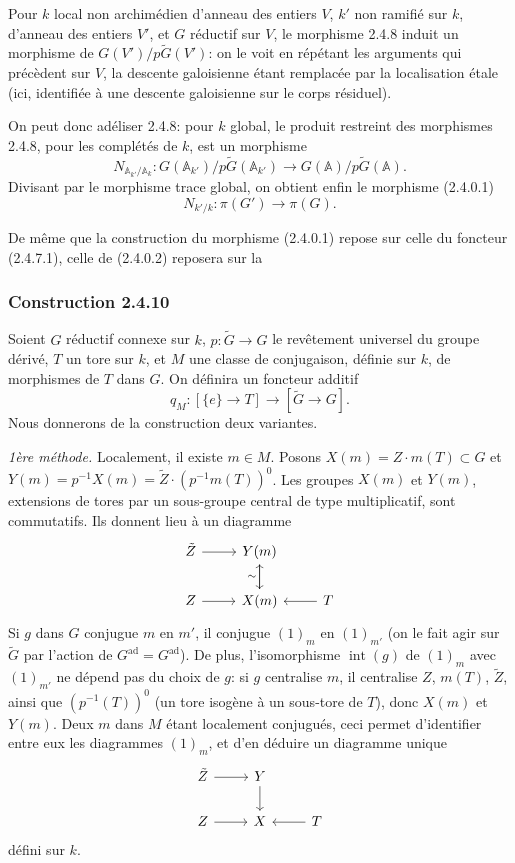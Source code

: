\documentclass[12pt,a4paper]{article}
\theoremstyle{plain}
\theoremstyle{definition}
\theoremstyle{remark}
\DeclareMathOperator{\Int}{int}
\newcommand{\A}{\mathbb{A}}
\begin{document}
\subsubsection{}

Pour $k$ local non archim\'edien d'anneau des entiers $V$, $k'$ non ramifi\'e sur $k$, d'anneau des entiers $V'$, et $G$ r\'eductif sur $V$, le morphisme 2.4.8 induit un morphisme de $G(V')/p\tilde{G}(V')$: on le voit en r\'ep\'etant les arguments qui pr\'ec\`edent sur $V$, la descente galoisienne \'etant remplac\'ee par la localisation \'etale (ici, identifi\'ee \`a une descente galoisienne sur le corps r\'esiduel).

On peut donc ad\'eliser 2.4.8: pour $k$ global, le produit restreint des morphismes 2.4.8, pour les compl\'et\'es de $k$, est un morphisme
\[
N_{\A_{k'}/\A_k}: G(\A_{k'})/p\tilde{G}(\A_{k'}) \to G(\A)/p\tilde{G}(\A).
\]
Divisant par le morphisme trace global, on obtient enfin le morphisme (2.4.0.1)
\[
N_{k'/k}: \pi(G') \to \pi(G).
\]

De m\^eme que la construction du morphisme (2.4.0.1) repose sur celle du foncteur (2.4.7.1), celle de (2.4.0.2) reposera sur la

\subsubsection*{Construction 2.4.10}

Soient $G$ r\'eductif connexe sur $k$, $p:\tilde{G} \to G$ le rev\^etement universel du groupe d\'eriv\'e, $T$ un tore sur $k$, et $M$ une classe de conjugaison, d\'efinie sur $k$, de morphismes de $T$ dans $G$. On d\'efinira un foncteur additif
\[
q_M: [\{e\} \to T] \to [\tilde{G} \to G].
\]
Nous donnerons de la construction deux variantes.

\textit{1\`ere m\'ethode.} Localement, il existe $m \in M$. Posons $X(m) = Z \cdot m(T) \subset G$ et $Y(m) = p^{-1}X(m) = \tilde{Z} \cdot (p^{-1}m(T))^0$. Les groupes $X(m)$ et $Y(m)$, extensions de tores par un sous-groupe central de type multiplicatif, sont commutatifs. Ils donnent lieu \`a un diagramme
\[
\begin{tikzcd}
\tilde{Z} \arrow[r] & Y(m) \arrow[d] \\
Z \arrow[r] & X(m) \arrow[u, "\sim"] & T \arrow[l]
\end{tikzcd}
\]
Si $g$ dans $G$ conjugue $m$ en $m'$, il conjugue $(1)_m$ en $(1)_{m'}$ (on le fait agir sur $\tilde{G}$ par l'action de $G^{\text{ad}} = G^{\text{ad}}$). De plus, l'isomorphisme $\Int(g)$ de $(1)_m$ avec $(1)_{m'}$ ne d\'epend pas du choix de $g$: si $g$ centralise $m$, il centralise $Z$, $m(T)$, $\tilde{Z}$, ainsi que $(p^{-1}(T))^0$ (un tore isog\`ene \`a un sous-tore de $T$), donc $X(m)$ et $Y(m)$. Deux $m$ dans $M$ \'etant localement conjugu\'es, ceci permet d'identifier entre eux les diagrammes $(1)_m$, et d'en d\'eduire un diagramme unique
\[
\begin{tikzcd}
\tilde{Z} \arrow[r] & Y \arrow[d] \\
Z \arrow[r] & X & T \arrow[l]
\end{tikzcd}
\]
d\'efini sur $k$.
\end{document}
